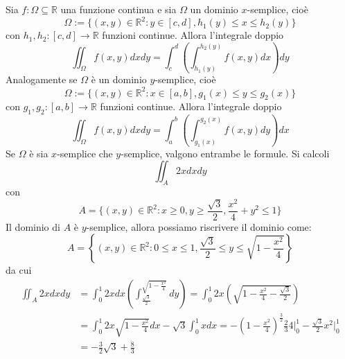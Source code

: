 \documentclass[a4paper]{article}
\numberwithin{equation}{subsection}
\begin{document}
\thm{}
{
    Sia $f: \Omega \subseteq \mathbb{R}$ una funzione continua e sia $\Omega$ un dominio $x$-semplice, cioè
    \[\Omega := \{(x,y) \in \mathbb{R}^2 : y \in [c,d], h_1(y) \le x \le h_2(y)\}\]
    con $h_1, h_2 : [c,d] \rightarrow \mathbb{R}$ funzioni continue. Allora l'integrale doppio
    \[\iint_\Omega f(x,y)dxdy = \int_c^d \left( \int_{h_1(y)}^{h_2(y)} f(x,y)dx\right)dy\] 
    Analogamente se $\Omega$ è un dominio $y$-semplice, cioè
    \[\Omega := \{(x,y) \in \mathbb{R}^2 : x \in [a,b], g_1(x) \le y \le g_2(x)\}\]
    con $g_1, g_2 : [a,b] \rightarrow \mathbb{R}$ funzioni continue. Allora l'integrale doppio
    \[\iint_\Omega f(x,y)dxdy = \int_a^b \left( \int_{g_1(x)}^{g_2(x)} f(x,y)dy\right)dx\]
    Se $\Omega$ è sia $x$-semplice che $y$-semplice, valgono entrambe le formule.
}
\ex{}
{
    Si calcoli 
    \[\iint_A 2xdxdy\]
    con
    \[A = \{(x,y) \in \mathbb{R}^2 : x \ge 0, y \ge \frac{\sqrt{3}}{2}, \frac{x^2}{4} + y^2 \le 1\}\]
    Il dominio di $A$ è $y$-semplice, allora possiamo riscrivere il dominio come:
    \[A = \left\{(x,y) \in \mathbb{R}^2 : 0 \le x \le 1, \frac{\sqrt{3}}{2} \le y \le \sqrt{1 - \frac{x^2}{4}}\right\}\]
    da cui 
    \[
    \begin{aligned}
        \iint_A 2xdxdy &= \int_0^1 2xdx \left(\int_{\frac{\sqrt{3}}{2}}^{\sqrt{1 - \frac{x^2}{4}}}dy\right) = \int_0^1 2x\left(\sqrt{1 - \frac{x^2}{4} - \frac{\sqrt{3}}{2}}\right)\\
        &= \int_0^1 2x\sqrt{1 - \frac{x^2}{4}}dx - \sqrt{3}\int_{0}^{1} x dx = - \left(1 - \frac{x^2}{4}\right)^{\frac{3}{2}} \frac{2}{3}4\Bigg|_0^1  - \frac{\sqrt{3}}{2}x^2\Bigg|_0^1\\
        &= -\frac{3}{2}\sqrt{3} + \frac{8}{3}
    \end{aligned}
    \]
}
\end{document}
